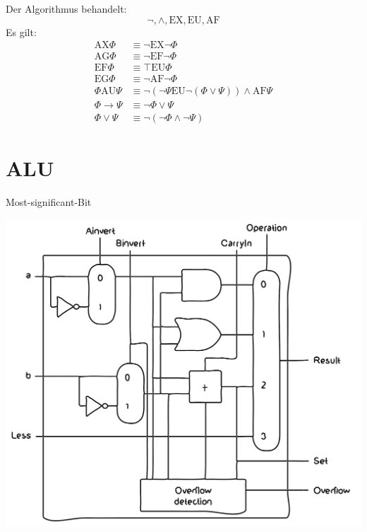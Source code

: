 \documentclass[a4paper,6pt]{article}
\begin{document}
\begin{multicols*}{3}
Der Algorithmus behandelt:
\[ \neg, \wedge, \text{EX}, \text{EU}, \text{AF} \]
Es gilt:
\begin{align*}
\text{AX}\Phi &\equiv \neg \text{EX}\neg \Phi \\
\text{AG}\Phi &\equiv \neg \text{EF}\neg \Phi \\
\text{EF}\Phi &\equiv \top \text{EU}\Phi \\
\text{EG}\Phi &\equiv \neg \text{AF}\neg \Phi \\
\Phi \text{AU}\Psi &\equiv \neg(\neg \Psi \text{EU} \neg(\Phi \vee \Psi)) \wedge \text{AF}\Psi \\
\Phi \rightarrow \Psi &\equiv \neg \Phi \vee \Psi \\
\Phi \vee \Psi &\equiv \neg(\neg \Phi \wedge \neg \Psi)
\end{align*}


\section{ALU}

Most-significant-Bit
\begin{center}
    \includegraphics[width=1\linewidth]{resources/MS_Bit.png}
\end{center}


\end{multicols*}
\end{document}
